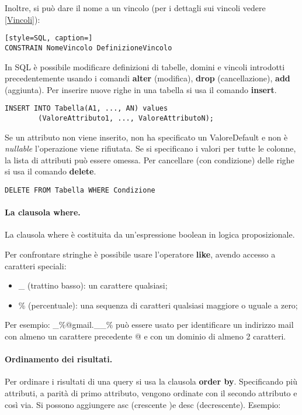 Inoltre, si può dare il nome a un vincolo (per i dettagli sui vincoli vedere \ref{Vincoli}): 

\begin{lstlisting}[style=SQL, caption=]
CONSTRAIN NomeVincolo DefinizioneVincolo
\end{lstlisting}

In SQL è possibile modificare definizioni di tabelle, domini e vincoli introdotti precedentemente usando i comandi \textbf{alter} (modifica), \textbf{drop} (cancellazione), \textbf{add} (aggiunta).
Per inserire nuove righe in una tabella si usa il comando \textbf{insert}.

\begin{lstlisting}[style=SQL, caption=Inserire nuove righe in una tabella]
INSERT INTO Tabella(A1, ..., AN) values
        (ValoreAttributo1, ..., ValoreAttributoN);
\end{lstlisting}

Se un attributo non viene inserito, non ha specificato un ValoreDefault e non è \textit{nullable} l'operazione viene rifiutata. Se si specificano i valori per tutte le colonne, la lista di attributi può essere omessa.
Per cancellare (con condizione) delle righe si usa il comando \textbf{delete}.
\begin{lstlisting}[style=SQL, caption=Cancellare righe in una tabella]
DELETE FROM Tabella WHERE Condizione
\end{lstlisting}

\paragraph{La clausola where.} La clausola where è costituita da un'espressione boolean in logica proposizionale.

Per confrontare stringhe è possibile usare l'operatore \textbf{like}, avendo accesso a caratteri speciali:
\begin{itemize}
    \item \_ (trattino basso): un carattere qualsiasi;
    \item \% (percentuale): una sequenza di caratteri qualsiasi maggiore o uguale a zero;
\end{itemize}

Per esempio: \_\%@gmail.\_\_\% può essere usato per identificare un indirizzo mail con almeno un carattere precedente @ e con un dominio di almeno 2 caratteri.

\paragraph{Ordinamento dei risultati.} Per ordinare i risultati di una query si usa la clausola \textbf{order by}. Specificando più attributi, a parità di primo attributo, vengono ordinate con il secondo attributo e così via. Si possono aggiungere asc (crescente )e desc (decrescente). Esempio:

